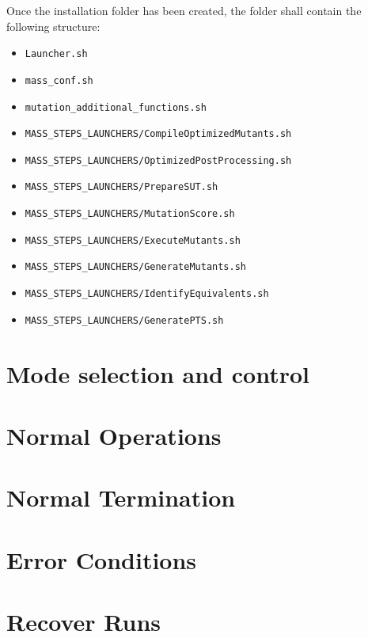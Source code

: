 Once the installation folder has been created, the folder shall contain the following structure:

\begin{itemize}
	\item \texttt{Launcher.sh}
	\item \texttt{mass_conf.sh}
	\item \texttt{mutation_additional_functions.sh}
	\item \texttt{MASS_STEPS_LAUNCHERS/CompileOptimizedMutants.sh}
	\item \texttt{MASS_STEPS_LAUNCHERS/OptimizedPostProcessing.sh}
	\item \texttt{MASS_STEPS_LAUNCHERS/PrepareSUT.sh}
	\item \texttt{MASS_STEPS_LAUNCHERS/MutationScore.sh}
	\item \texttt{MASS_STEPS_LAUNCHERS/ExecuteMutants.sh}
	\item \texttt{MASS_STEPS_LAUNCHERS/GenerateMutants.sh}
	\item \texttt{MASS_STEPS_LAUNCHERS/IdentifyEquivalents.sh}
	\item \texttt{MASS_STEPS_LAUNCHERS/GeneratePTS.sh}
\end{itemize}


\section{Mode selection and control}

\section{Normal Operations}

\section{Normal Termination}

\section{Error Conditions}

\section{Recover Runs}


